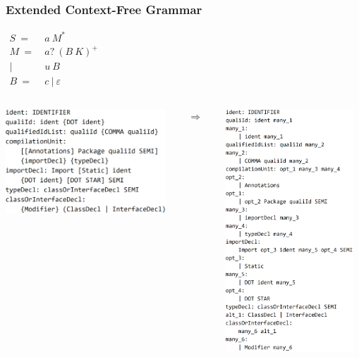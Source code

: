 \documentclass{beamer}
\begin{document}
	\begin{frame} 
		\frametitle{Extended Context-Free Grammar}
		\begin{center}
			{$\begin{aligned}
				S\ =&\ a\ M^* \\
				M\ =&\ a?\ (B\ K)^+ \\
				|&\ u\ B \\
				B\ =&\ c\ |\ \varepsilon
				\end{aligned}$}
		\end{center}
	\end{frame}
	
	\begin{frame}
		\begin{columns}
			\begin{column}{6.1cm}
				\includegraphics[width=6cm]{pictures/java_before.png}
			\end{column}
			\begin{column}{.7cm}
				$ \Longrightarrow $
			\end{column}
			\begin{column}{5cm}
				\includegraphics[width=4.8cm]{pictures/java_after.png}
			\end{column}
	    \end{columns}
	\end{frame}
\end{document}
